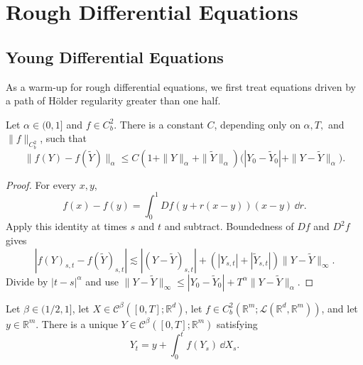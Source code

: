 \chapter{Rough Differential Equations}

\section{Young Differential Equations}

As a warm-up for rough differential equations, we first treat equations driven
by a path of Hölder regularity greater than one half.

\begin{lem}
Let $\alpha\in(0,1]$ and $f\in C_b^2$.  There is a constant $C$, depending
only on $\alpha,T,$ and $\|f\|_{C_b^2}$, such that
\[
 \|f(Y)-f(\widetilde Y)\|_\alpha
 \le C(1+\|Y\|_\alpha+\|\widetilde Y\|_\alpha)
 \bigl(|Y_0-\widetilde Y_0|+\|Y-\widetilde Y\|_\alpha\bigr).
\]
\end{lem}

\begin{proof}
For every $x,y$,
\[
 f(x)-f(y)=\int_0^1Df(y+r(x-y))(x-y)\,\dd r.
\]
Apply this identity at times $s$ and $t$ and subtract.  Boundedness of $Df$ and
$D^2f$ gives
\[
 |f(Y)_{s,t}-f(\widetilde Y)_{s,t}|
 \lesssim |(Y-\widetilde Y)_{s,t}|
 +(|Y_{s,t}|+|\widetilde Y_{s,t}|)\|Y-\widetilde Y\|_\infty.
\]
Divide by $|t-s|^\alpha$ and use
$\|Y-\widetilde Y\|_\infty
 \le|Y_0-\widetilde Y_0|+T^\alpha\|Y-\widetilde Y\|_\alpha$.
\end{proof}

\begin{prop}
Let $\beta\in(1/2,1]$, let
$X\in\mathcal C^\beta([0,T];\mathbb R^d)$, let
$f\in C_b^2(\mathbb R^m;\mathcal L(\mathbb R^d,\mathbb R^m))$, and let
$y\in\mathbb R^m$.  There is a unique
$Y\in\mathcal C^\beta([0,T];\mathbb R^m)$ satisfying
\[
  Y_t=y+\int_0^t f(Y_s)\,\dd X_s.
\]
\end{prop}

